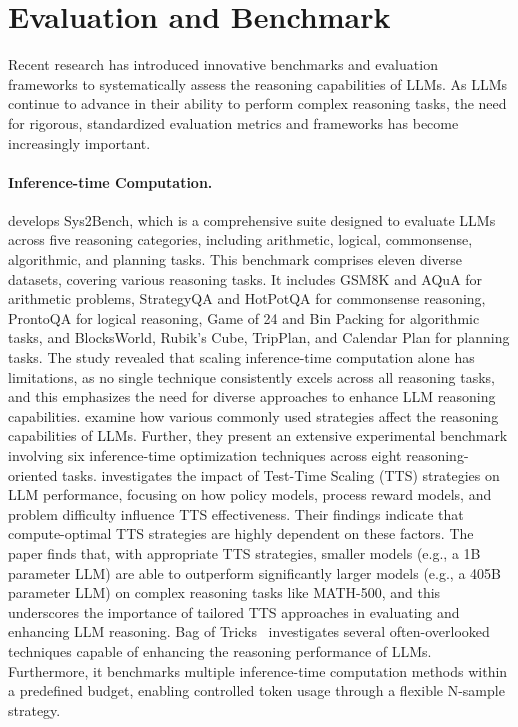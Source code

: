 \section{Evaluation and Benchmark}
\label{sec:evaluation}

Recent research has introduced innovative benchmarks and evaluation frameworks to systematically assess the reasoning capabilities of LLMs. As LLMs continue to advance in their ability to perform complex reasoning tasks, the need for rigorous, standardized evaluation metrics and frameworks has become increasingly important. 

\paragraph{\textbf{Inference-time Computation.}} \cite{parashar2025inferencetimecomputationsllmreasoning} develops Sys2Bench, which is a comprehensive suite designed to evaluate LLMs across five reasoning categories, including arithmetic, logical, commonsense, algorithmic, and planning tasks. This benchmark comprises eleven diverse datasets, covering various reasoning tasks. It includes GSM8K and AQuA for arithmetic problems, StrategyQA and HotPotQA for commonsense reasoning, ProntoQA for logical reasoning, Game of 24 and Bin Packing for algorithmic tasks, and BlocksWorld, Rubik’s Cube, TripPlan, and Calendar Plan for planning tasks. The study revealed that scaling inference-time computation alone has limitations, as no single technique consistently excels across all reasoning tasks, and this emphasizes the need for diverse approaches to enhance LLM reasoning capabilities. \cite{liu2025bag} examine how various commonly used strategies affect the reasoning capabilities of LLMs. Further, they present an extensive experimental benchmark involving six inference-time optimization techniques across eight reasoning-oriented tasks. \cite{liu20251bllmsurpass405b} investigates the impact of Test-Time Scaling (TTS) strategies on LLM performance, focusing on how policy models, process reward models, and problem difficulty influence TTS effectiveness. Their findings indicate that compute-optimal TTS strategies are highly dependent on these factors. The paper finds that, with appropriate TTS strategies, smaller models (e.g., a 1B parameter LLM) are able to outperform significantly larger models (e.g., a 405B parameter LLM) on complex reasoning tasks like MATH-500, and this underscores the importance of tailored TTS approaches in evaluating and enhancing LLM reasoning. Bag of Tricks~\cite{liu2025bagoftrick} investigates several often-overlooked techniques capable of enhancing the reasoning performance of LLMs. Furthermore, it benchmarks multiple inference-time computation methods within a predefined budget, enabling controlled token usage through a flexible N-sample strategy.

